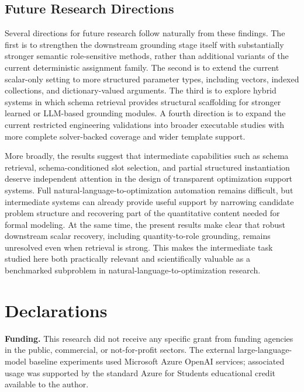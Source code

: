 \documentclass[pdflatex,sn-basic,Numbered]{sn-jnl}
\begin{document}
\subsection{Future Research Directions}
\label{subsec:future_work}

Several directions for future research follow naturally from these findings. The first is to strengthen the downstream grounding stage itself with substantially stronger semantic role-sensitive methods, rather than additional variants of the current deterministic assignment family. The second is to extend the current scalar-only setting to more structured parameter types, including vectors, indexed collections, and dictionary-valued arguments. The third is to explore hybrid systems in which schema retrieval provides structural scaffolding for stronger learned or LLM-based grounding modules. A fourth direction is to expand the current restricted engineering validations into broader executable studies with more complete solver-backed coverage and wider template support.

More broadly, the results suggest that intermediate capabilities such as schema retrieval, schema-conditioned slot selection, and partial structured instantiation deserve independent attention in the design of transparent optimization support systems. Full natural-language-to-optimization automation remains difficult, but intermediate systems can already provide useful support by narrowing candidate problem structure and recovering part of the quantitative content needed for formal modeling. At the same time, the present results make clear that robust downstream scalar recovery, including quantity-to-role grounding, remains unresolved even when retrieval is strong. This makes the intermediate task studied here both practically relevant and scientifically valuable as a benchmarked subproblem in natural-language-to-optimization research.


\backmatter

\section*{Declarations}

\noindent\textbf{Funding.} This research did not receive any specific grant from funding agencies in the public, commercial, or not-for-profit sectors. The external large-language-model baseline experiments used Microsoft Azure OpenAI services; associated usage was supported by the standard Azure for Students educational credit available to the author.
\end{document}
